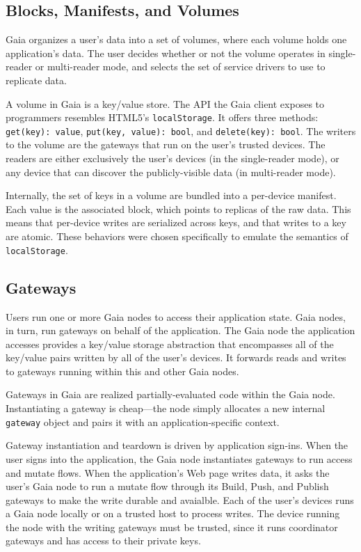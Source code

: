 \subsection{Blocks, Manifests, and Volumes}

Gaia organizes a user's data into a set of volumes, where each volume
holds one application's data.  The user decides whether or not the volume
operates in single-reader or multi-reader mode, and selects the set of
service drivers to use to replicate data.

A volume in Gaia is a key/value store.  The API the Gaia client exposes to
programmers resembles HTML5's \texttt{localStorage}.  It offers three methods:
\texttt{get(key): value}, \texttt{put(key, value): bool}, and
\texttt{delete(key): bool}.  The writers to the volume are the gateways that run
on the user's trusted devices.  The readers are either exclusively the user's
devices (in the single-reader mode), or any device that can discover the
publicly-visible data (in multi-reader mode).

Internally, the set of keys in a volume are bundled into a per-device manifest.
Each value is the associated block, which points to replicas of the raw data.
This means that per-device writes are serialized
across keys, and that writes to a key are atomic.  These behaviors were chosen
specifically to emulate the semantics of \texttt{localStorage}.

\subsection{Gateways}

Users run one or more Gaia nodes to access their application state.  Gaia nodes,
in turn, run gateways on behalf of the application.  The Gaia node the
application accesses provides a key/value storage abstraction that encompasses
all of the key/value pairs written by all of the user's devices.  It forwards
reads and writes to gateways running within this and other Gaia nodes.

Gateways in Gaia are realized partially-evaluated code within the Gaia
node.  Instantiating a gateway is cheap---the node simply allocates
a new internal \texttt{gateway} object and pairs it with an
application-specific context.

Gateway instantiation and teardown is driven by application sign-ins.
When the user signs into the application, the Gaia node instantiates gateways to
run access and mutate flows.  When the application's Web page writes data,
it asks the user's Gaia node to run a mutate flow through its Build, Push, and
Publish gateways to make the write durable and avaialble.
Each of the user's devices runs a Gaia node locally or on a trusted host to
process writes.  The device running the node with the writing gateways
must be trusted, since it runs coordinator gateways and has access to their
private keys.

